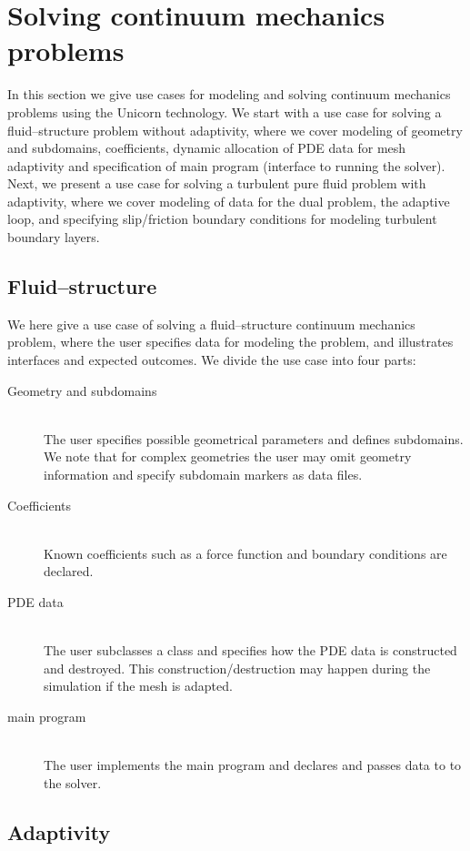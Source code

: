 \section{Solving continuum mechanics problems}

In this section we give use cases for modeling and solving continuum
mechanics problems using the Unicorn technology. We start with a use
case for solving a fluid--structure problem without adaptivity, where
we cover modeling of geometry and subdomains, coefficients, dynamic
allocation of PDE data for mesh adaptivity and specification of main
program (interface to running the solver). Next, we present a use case
for solving a turbulent pure fluid problem with adaptivity, where we
cover modeling of data for the dual problem, the adaptive loop, and
specifying slip/friction boundary conditions for modeling turbulent
boundary layers.


\subsection{Fluid--structure}

We here give a use case of solving a fluid--structure continuum mechanics
problem, where the user specifies data for modeling the problem, and
illustrates interfaces and expected outcomes. We divide the use case
into four parts:

\begin{description}
\item[Geometry and subdomains]
\ \\
The user specifies possible geometrical parameters and defines
subdomains. We note that for complex geometries the user may omit
geometry information and specify subdomain markers as data files.
\item[Coefficients]
\ \\
Known coefficients such as a force function and boundary conditions
are declared.
\item[PDE data]
\ \\
The user subclasses a  class and specifies how the PDE
data is constructed and destroyed. This construction/destruction may
happen during the simulation if the mesh is adapted.
\item[main program]
\ \\
The user implements the main program and declares and passes data to
to the solver.
\end{description}

\subsection{Adaptivity}

